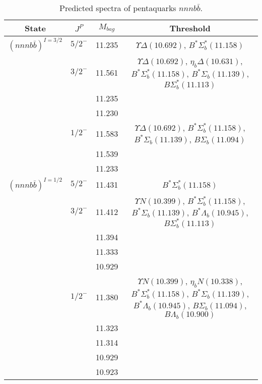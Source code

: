 \documentclass[prd,twocolumn,floatfix,nofootinbib]{revtex4}
\begin{document}
\renewcommand{\tabcolsep}{0.2cm}
\renewcommand{\arraystretch}{1.2}
\begin{table*}[!htbp]
    \caption{Predicted spectra of pentaquarks $nnnb\bar{b}$.}
    \begin{tabular}{cccc}
        \hline\hline
        {\rm State} &$J^{P}$ &$M_{bag}$ &Threshold \\ \hline
        ${(nnnb\bar{b})}^{I=3/2}$
            &${5/2}^{-}$    &11.235  &$\Upsilon\Delta(10.692)$, $B^{\ast}\Sigma_{b}^{\ast}(11.158)$ \\
            &${3/2}^{-}$    &11.561  &$\Upsilon\Delta(10.692)$, $\eta_{b}\Delta(10.631)$, $B^{\ast}\Sigma_{b}^{\ast}(11.158)$, $B^{\ast}\Sigma_{b}(11.139)$, $B\Sigma_{b}^{\ast}(11.113)$ \\
            &               &11.235  & \\
            &               &11.230  & \\
            &${1/2}^{-}$    &11.583  &$\Upsilon\Delta(10.692)$, $B^{\ast}\Sigma_{b}^{\ast}(11.158)$, $B^{\ast}\Sigma_{b}(11.139)$, $B\Sigma_{b}(11.094)$ \\
            &               &11.539  & \\
            &               &11.233  & \\
        ${(nnnb\bar{b})}^{I=1/2}$
            &${5/2}^{-}$    &11.431  &$B^{\ast}\Sigma_{b}^{\ast}(11.158)$ \\
            &${3/2}^{-}$    &11.412  &$\Upsilon N(10.399)$, $B^{\ast}\Sigma_{b}^{\ast}(11.158)$, $B^{\ast}\Sigma_{b}(11.139)$, $B^{\ast}\Lambda_{b}(10.945)$, $B\Sigma_{b}^{\ast}(11.113)$ \\
            &               &11.394  & \\
            &               &11.333  & \\
            &               &10.929  & \\
            &${1/2}^{-}$    &11.380  &$\Upsilon N(10.399)$, $\eta_{b}N(10.338)$, $B^{\ast}\Sigma_{b}^{\ast}(11.158)$, $B^{\ast}\Sigma_{b}(11.139)$, $B^{\ast}\Lambda_{b}(10.945)$, $B\Sigma_{b}(11.094)$, $B\Lambda_{b}(10.900)$ \\
            &               &11.323  & \\
            &               &11.314  & \\
            &               &10.929  & \\
            &               &10.923  & \\
        \hline\hline
    \end{tabular}
\end{table*}
\end{document}
